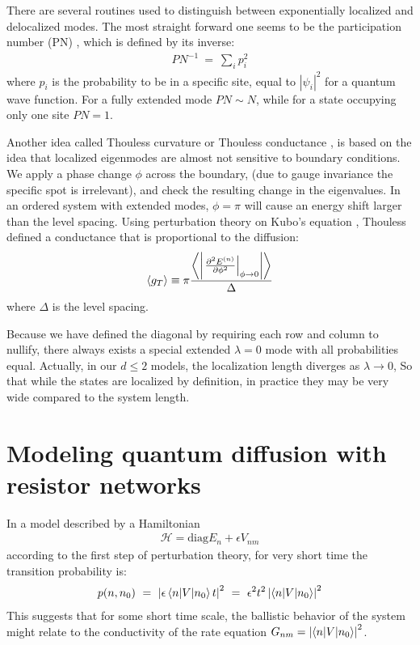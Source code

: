 There are several routines used to distinguish between exponentially localized and delocalized modes.
The most straight forward one seems to be the participation number (PN) 
\cite{edwards_numerical_1972}, which is defined by its inverse:
%
\begin{align}
PN^{-1} \ =\ \sum_i p_i^2
\end{align}
where $p_i$ is the probability to be in a specific site, equal to $|\psi_i|^2$ 
for a quantum wave function. For a fully extended mode $PN\sim N$, while for a state
occupying only one site $PN = 1 $.


Another idea called Thouless curvature or Thouless conductance 
\cite{edwards_numerical_1972,thouless_electrons_1974,braun_level_1997}, is based
on the idea that localized eigenmodes are almost not sensitive to boundary conditions. We apply a 
phase change $\phi$ across the boundary, (due to gauge invariance the specific spot is irrelevant),
and check the resulting change in the eigenvalues. 
In an ordered system with extended modes, $\phi=\pi$ will cause an energy
shift larger than the level spacing. 
Using perturbation theory on Kubo's equation \cite{kubo_statistical-mechanical_1957},
Thouless defined a conductance that is proportional to the diffusion: 
\begin{align}\label{eq:thouless}
\left\langle g_T\right\rangle  \equiv \pi \frac{\left\langle \left|\left. \frac{\partial ^2 E^{(n)}}{\partial \phi^2}\right|_{\phi\rightarrow 0}\right|\right\rangle}{\Delta}
\end{align}
where $\Delta$ is the level spacing.



Because we have defined the diagonal by requiring each row and column to nullify,
there always exists a special extended $\lambda=0$ mode with all probabilities equal. 
Actually, in our $d\le 2$ models, the localization length diverges as $\lambda\rightarrow 0$,
So that while the states are localized by definition, in practice they may be very wide
compared to the system length.



\section{Modeling quantum diffusion with resistor networks}


In a model described by a Hamiltonian 
%
\begin{align}
\mathcal{H} = \textrm{diag}{E_n} + \epsilon {V_{nm}}
\end{align}
%
according to the first step of perturbation theory,
for very short time the transition probability is:
%
\begin{align}
 p(n, n_0)\ =\ \left| \epsilon \bra n| V |n_0\ket t\right|^2 \ = \ \epsilon^2 t^2\left| \bra n| V |n_0\ket \right|^2
\end{align}
%
This suggests that for some short time scale, the ballistic behavior
of the system might relate to the conductivity of the rate equation $G_{nm} = \left| \left\langle n| V |n_0\right\rangle \right|^2$.




